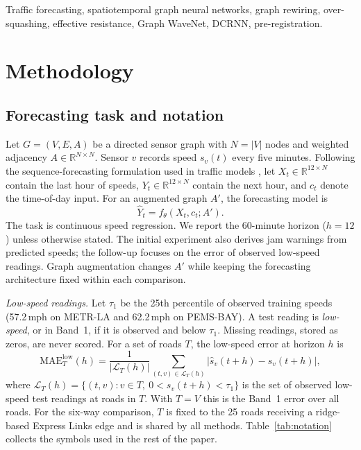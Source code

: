 \documentclass[journal]{IEEEtran}
\newcommand{\ms}{\,mph}
\begin{document}
\begin{IEEEkeywords}
Traffic forecasting, spatiotemporal graph neural networks, graph rewiring, over-squashing, effective resistance, Graph WaveNet, DCRNN, pre-registration.
\end{IEEEkeywords}





\section{Methodology}\label{sec:methods}
\subsection{Forecasting task and notation}\label{sec:task}
Let $G=(V,E,A)$ be a directed sensor graph with $N=|V|$ nodes and weighted adjacency $A\in\mathbb{R}^{N\times N}$. Sensor $v$ records speed $s_v(t)$ every five minutes. Following the sequence-forecasting formulation used in traffic models \cite{li2018dcrnn,wu2019graphwavenet}, let $X_t\in\mathbb{R}^{12\times N}$ contain the last hour of speeds, $Y_t\in\mathbb{R}^{12\times N}$ contain the next hour, and $c_t$ denote the time-of-day input. For an augmented graph $A'$, the forecasting model is
\begin{equation}
\widehat Y_t=f_\theta(X_t,c_t;A').
\label{eq:forecast_map}
\end{equation}
The task is continuous speed regression. We report the 60-minute horizon ($h=12$) unless otherwise stated. The initial experiment also derives jam warnings from predicted speeds; the follow-up focuses on the error of observed low-speed readings. Graph augmentation changes $A'$ while keeping the forecasting architecture fixed within each comparison.

\textit{Low-speed readings.} Let $\tau_1$ be the 25th percentile of observed training speeds (57.2\ms{} on METR-LA and 62.2\ms{} on PEMS-BAY). A test reading is \emph{low-speed}, or in Band~1, if it is observed and below $\tau_1$. Missing readings, stored as zeros, are never scored. For a set of roads $T$, the low-speed error at horizon $h$ is
\begin{equation}
\mathrm{MAE}^{\mathrm{low}}_{T}(h)=\frac{1}{|\mathcal{L}_T(h)|}\sum_{(t,v)\in\mathcal{L}_T(h)}\bigl\lvert\hat s_v(t{+}h)-s_v(t{+}h)\bigr\rvert ,
\label{eq:lowmae}
\end{equation}
where $\mathcal{L}_T(h)=\{(t,v): v\in T,\ 0<s_v(t{+}h)<\tau_1\}$ is the set of observed low-speed test readings at roads in $T$.
With $T=V$ this is the Band~1 error over all roads. For the six-way comparison, $T$ is fixed to the 25 roads receiving a ridge-based Express Links edge and is shared by all methods. Table~\ref{tab:notation} collects the symbols used in the rest of the paper.
\end{document}
